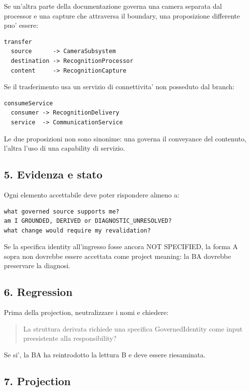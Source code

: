 \documentclass[11pt,a4paper]{article}
\begin{document}
Se un'altra parte della documentazione governa una camera separata dal processor e una capture che attraversa il boundary, una proposizione differente puo' essere:

\begin{lstlisting}
transfer
  source      -> CameraSubsystem
  destination -> RecognitionProcessor
  content     -> RecognitionCapture
\end{lstlisting}

Se il trasferimento usa un servizio di connettivita' non posseduto dal branch:

\begin{lstlisting}
consumeService
  consumer -> RecognitionDelivery
  service  -> CommunicationService
\end{lstlisting}

Le due proposizioni non sono sinonime: una governa il conveyance del contenuto, l'altra l'uso di una capability di servizio.

\subsection{5. Evidenza e stato}

Ogni elemento accettabile deve poter rispondere almeno a:

\begin{lstlisting}
what governed source supports me?
am I GROUNDED, DERIVED or DIAGNOSTIC_UNRESOLVED?
what change would require my revalidation?
\end{lstlisting}

Se la specifica identity all'ingresso fosse ancora NOT SPECIFIED, la forma A sopra non dovrebbe essere accettata come project meaning: la BA dovrebbe preservare la diagnosi.

\subsection{6. Regression}

Prima della projection, neutralizzare i nomi e chiedere:

\begin{quote}
La struttura derivata richiede una specifica GovernedIdentity come input preesistente alla responsibility?
\end{quote}

Se si', la BA ha reintrodotto la lettura B e deve essere riesaminata.

\subsection{7. Projection}
\end{document}
